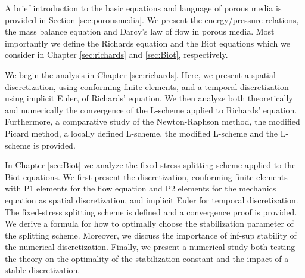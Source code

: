 \documentclass[../Main/main.tex]{subfiles}
\begin{document}
A brief introduction to the basic equations and language of porous media is provided in Section \ref{sec:porousmedia}. We present the energy/pressure relations, the mass balance equation and Darcy's law of flow in porous media. Most importantly we define the Richards equation and the Biot equations which we consider in Chapter \ref{sec:richards} and \ref{sec:Biot}, respectively.

We begin the analysis in Chapter \ref{sec:richards}. Here, we present a spatial discretization, using conforming finite elements, and a temporal discretization using implicit Euler, of Richards' equation. We then analyze both theoretically and numerically the convergence of the L-scheme applied to Richards' equation. Furthermore, a comparative study of the Newton-Raphson method, the modified Picard method, a locally defined L-scheme, the modified L-scheme and the L-scheme is provided. 

In Chapter \ref{sec:Biot} we analyze the fixed-stress splitting scheme applied to the Biot equations. We first present the discretization, conforming finite elements with P1 elements for the flow equation and P2 elements for the mechanics equation as spatial discretization, and implicit Euler for temporal discretization. The fixed-stress splitting scheme is defined and a convergence proof is provided. We derive a formula for how to optimally choose the stabilization parameter of the splitting scheme. Moreover, we discuss the importance of inf-sup stability of the numerical discretization. Finally, we present a numerical study both testing the theory on the optimality of the stabilization constant and the impact of a stable discretization. 
\end{document}
